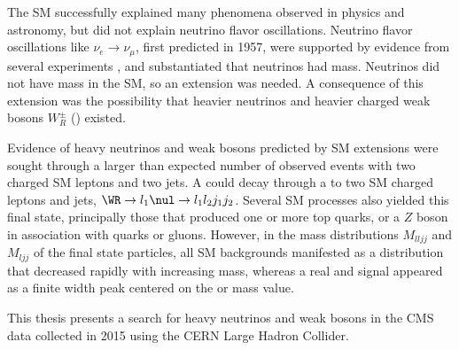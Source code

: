 The SM successfully explained many phenomena observed in physics and astronomy, but did not explain neutrino 
flavor oscillations.  Neutrino flavor oscillations like $\nu_{e} \rightarrow \nu_{\mu}$, first predicted in 1957, 
were supported by evidence from several experiments \cite{kamiokandeTwo,solarNuSummary,NOvAresults,mainzPhaseIIResults,t2kResults}, and 
substantiated that neutrinos had mass.  Neutrinos did not have mass in the SM, so an extension was needed.  
A consequence of this extension was the possibility that heavier neutrinos \nul and heavier charged weak 
bosons $W^{\pm}_{R}$ (\WR) existed.

Evidence of heavy neutrinos \nul and weak bosons \WR predicted by SM extensions were sought through a larger 
than expected number of observed events with two charged SM leptons and two jets.  A \WR could decay through 
a \nul to two SM charged leptons and jets, $\WR \rightarrow l_{1}\nul \rightarrow l_{1}l_{2}j_{1}j_{2}$.  
Several SM processes also yielded this final state, principally those that produced one or more top quarks, or 
a $Z$ boson in association with quarks or gluons.  However, in the mass distributions $M_{lljj}$ and $M_{ljj}$ 
of the final state particles, all SM backgrounds manifested as a distribution that decreased rapidly with increasing 
mass, whereas a real \WR and \nul signal appeared as a finite width peak centered on the \WR or \nul mass value.

This thesis presents a search for heavy neutrinos \nul and weak bosons \WR in the CMS data collected 
in 2015 using the CERN Large Hadron Collider.


